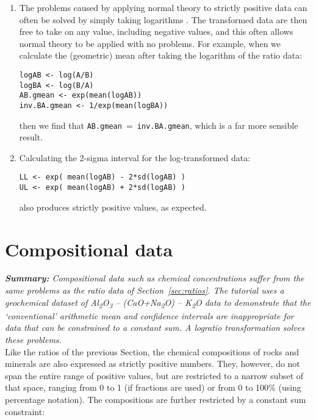 \documentclass[11pt]{article}
\begin{document}
\begin{enumerate}
\item The problems caused by applying normal theory to strictly
  positive data can often be solved by simply taking logarithms
  \citep{aitchison1957}. The transformed data are then free to take on
  any value, including negative values, and this often allows normal
  theory to be applied with no problems.  For example, when we
  calculate the (geometric) mean after taking the logarithm of the
  ratio data:

\begin{verbatim}
logAB <- log(A/B)
logBA <- log(B/A)
AB.gmean <- exp(mean(logAB))
inv.BA.gmean <- 1/exp(mean(logBA))
\end{verbatim}

then we find that \texttt{AB.gmean}~=~\texttt{inv.BA.gmean}, which is
a far more sensible result.

\item Calculating the 2-sigma interval for the log-transformed data:

\begin{verbatim}
LL <- exp( mean(logAB) - 2*sd(logAB) )
UL <- exp( mean(logAB) + 2*sd(logAB) )
\end{verbatim}

also produces strictly positive values, as expected.

\end{enumerate}

\section{Compositional data}
\label{sec:compositional}

\textit{\textbf{Summary:} Compositional data such as chemical
  concentrations suffer from the same problems as the ratio data of
  Section~\ref{sec:ratios}. The tutorial uses a geochemical dataset of
  Al\textsubscript{2}O\textsubscript{3} -- (CaO+Na\textsubscript{2}O)
  -- K\textsubscript{2}O data to demonstrate that the `conventional'
  arithmetic mean and confidence intervals are inappropriate for data
  that can be constrained to a constant sum. A logratio transformation
  solves these problems.}\\

Like the ratios of the previous Section, the chemical compositions of
rocks and minerals are also expressed as strictly positive
numbers. They, however, do not span the entire range of positive
values, but are restricted to a narrow subset of that space, ranging
from 0 to 1 (if fractions are used) or from 0 to 100\% (using
percentage notation).  The compositions are further restricted by a
constant sum constraint:
\end{document}
